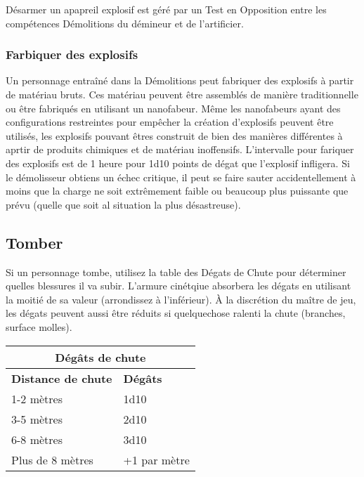 Désarmer un apapreil explosif est géré par un Test en Opposition entre les compétences Démolitions du démineur et de l'artificier. 



\subsubsection{Farbiquer des explosifs} 

Un personnage entraîné dans la Démolitions peut fabriquer des explosifs à partir de matériau bruts. Ces matériau peuvent être assemblés de manière traditionnelle ou être fabriqués en utilisant un nanofabeur. Même les nanofabeurs ayant des configurations restreintes pour empêcher la création d'explosifs peuvent être utilisés, les explosifs pouvant êtres construit de bien des manières différentes à aprtir de produits chimiques et de matériau inoffensifs. L'intervalle pour fariquer des explosifs est de 1 heure pour 1d10 points de dégat que l'explosif infligera. Si le démolisseur obtiens un échec critique, il peut se faire sauter accidentellement à moins que la charge ne soit extrêmement faible ou beaucoup plus puissante que prévu (quelle que soit al situation la plus désastreuse). 



\subsection{Tomber} \label{sec:falling} 

Si un personnage tombe, utilisez la table des Dégats de Chute pour déterminer quelles blessures il va subir. L'armure cinétqiue absorbera les dégats en utilisant la moitié de sa valeur (arrondissez à l'inférieur). À la discrétion du maître de jeu, les dégats peuvent aussi être réduits si quelquechose ralenti la chute (branches, surface molles). 

\begin{table} \begin{tabular}{|l|l|} \hline

\multicolumn{2}{|c|}{\textbf{Dégâts de chute}}	\\ \hline

\textbf{Distance de chute}	&\textbf{Dégâts}	\\ \hline

1-2 mètres	&1d10	\\ \hline

3-5 mètres	&2d10	\\ \hline

6-8 mètres	&3d10	\\ \hline

Plus de 8 mètres	&+1 par mètre	\\ \hline

\end{tabular} \label{tab:falling-damage} \end{table} 




